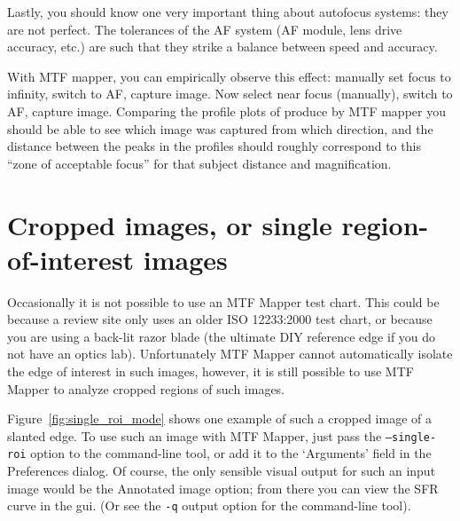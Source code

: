 \documentclass[a4paper]{article}
\begin{document}
Lastly, you should know one very important thing about autofocus systems:
they are not perfect. The tolerances of the AF system (AF module, lens
drive accuracy, etc.) are such that they strike a balance between speed and
accuracy. 

With MTF mapper, you can empirically observe this effect:
manually set focus to infinity, switch to AF, capture image. Now select near
focus (manually), switch to AF, capture image. Comparing the profile plots
of produce by MTF mapper you should be able to see which image was captured
from which direction, and the distance between the peaks in the profiles
should roughly correspond to this ``zone of acceptable focus'' for that
subject distance and magnification.

\section{Cropped images, or single region-of-interest images}
\label{sec:single_roi_mode}
Occasionally it is not possible to use an MTF Mapper test chart. This could
be because a review site only uses an older ISO 12233:2000 test chart, or
because you are using a back-lit razor blade (the ultimate DIY reference edge if
you do not have an optics lab). Unfortunately MTF Mapper cannot
automatically isolate the edge of interest in such images, however, 
it is still possible to use MTF Mapper to analyze cropped regions of such
images.

Figure~\ref{fig:single_roi_mode} shows one example of such a cropped image
of a slanted edge. To use such an image with MTF Mapper, just pass the
\texttt{--single-roi} option to the command-line tool, or add it to the
`Arguments' field in the \textsf{Preferences} dialog. Of course, the only
sensible visual output for such an input image would be the \textsf{Annotated
image} option; from there you can view the SFR curve in the gui. (Or see the
\texttt{-q} output option for the command-line tool).
\end{document}
